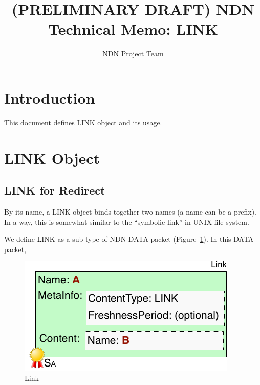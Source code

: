 \documentclass[10pt]{article}
\title{(PRELIMINARY DRAFT) NDN Technical Memo: LINK}
\author{NDN Project Team}
\date{}
\begin{document}
\maketitle



\section{Introduction}

This document defines LINK object and its usage.

\section{LINK Object}

\subsection{LINK for Redirect}

By its name, a LINK object binds together two names (a name can be a prefix).
In a way, this is somewhat similar to the ``symbolic link'' in UNIX file system.

We define LINK as a sub-type of NDN DATA packet (Figure~\ref{fig:link}). In this DATA packet,

\begin{figure}[h]
  \centering
  \includegraphics[scale=0.8]{ndn-link}
  \caption{Link}
  \label{fig:link}
\end{figure}
\end{document}

